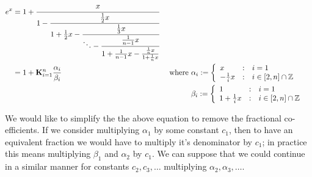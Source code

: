 \begin{align}
e^x &= 1 + \cfrac{x}{1 -
		   \cfrac{\frac{1}{2}x}{1 + \frac{1}{2}x - 
		   \cfrac{\frac{1}{3}x}{\ddots - 
		   \cfrac{\frac{1}{n-1}x}{1 + \frac{1}{n-1}x - 
		   \frac{\frac{1}{n}x}{1 + \frac{1}{n}x} } } } }
		   \label{EQN_"exp cont frac 1"}\\
	&= 1 + \mathbf{K}_{i=1}^n\frac{\alpha_i}{\beta_i} &\textrm{ where }
		&\alpha_i := \left\{\begin{array}{lcl}
			x&:&i=1\\
			-\frac{1}{i}x &:& i \in [2, n]\cap\mathbb{Z}
			\end{array}\right.\nonumber\\
	&	&&\beta_i := \left\{\begin{array}{lcl}
			1 &:& i=1\\
			1 + \frac{1}{i}x &:& i \in [2,n]\cap\mathbb{Z}
			\end{array}\right.\nonumber
\end{align}

We would like to simplify the the above equation to remove the fractional co-efficients. If we consider multiplying \(\alpha_1\) by some constant \(c_1\), then to have an equivalent fraction we would have to multiply it's denominator by \(c_1\); in practice this means multiplying \(\beta_1\) and \(\alpha_2\) by \(c_1\). We can suppose that we could continue in a similar manner for constants \(c_2, c_3, \ldots\) multiplying \(\alpha_2, \alpha_3, \ldots\).

